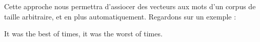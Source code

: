 \documentclass[11pt, a4paper]{report}
\begin{document}
Cette approche nous permettra d'assiocer des vecteurs aux mots d'un corpus de taille 
arbitraire, et en plus automatiquement. Regardons sur un exemple :
\begin{center}
  It was the best of times, it was the worst of times.                                                                                                                                                                                                                                                                                                                                                                                                                                                                                                                                                                                                                                                                                                                                                                                                                                                                                                                                                                                                                                                                                                                                                                                                                                                                                                                                                                                                                                                                                                                                                                                                                                                                                                                                                                                                                                                                                                                                                                                                                                                                                                                                                                                                                                                                                                                                                                                                                                                                                                                                                                                                                                                                                                                                                                                                                                                                                                                                                                                                                                                                                                                                                                          
\end{center}
\end{document}
